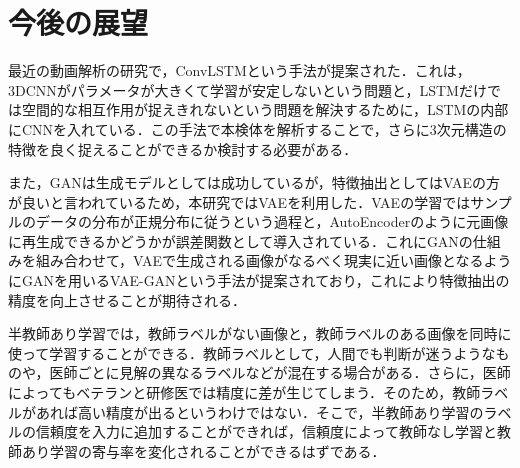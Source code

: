 \section{今後の展望}
最近の動画解析の研究で，ConvLSTMという手法が提案された\cite{要出典}．これは，3DCNNがパラメータが大きくて学習が安定しないという問題と，LSTMだけでは空間的な相互作用が捉えきれないという問題を解決するために，LSTMの内部にCNNを入れている．この手法で本検体を解析することで，さらに3次元構造の特徴を良く捉えることができるか検討する必要がある．

また，GANは生成モデルとしては成功しているが，特徴抽出としてはVAEの方が良いと言われているため，本研究ではVAEを利用した．VAEの学習ではサンプルのデータの分布が正規分布に従うという過程と，AutoEncoderのように元画像に再生成できるかどうかが誤差関数として導入されている．これにGANの仕組みを組み合わせて，VAEで生成される画像がなるべく現実に近い画像となるようにGANを用いるVAE-GANという手法が提案されており，これにより特徴抽出の精度を向上させることが期待される\cite{要出典}．

半教師あり学習では，教師ラベルがない画像と，教師ラベルのある画像を同時に使って学習することができる．教師ラベルとして，人間でも判断が迷うようなものや，医師ごとに見解の異なるラベルなどが混在する場合がある．さらに，医師によってもベテランと研修医では精度に差が生じてしまう．そのため，教師ラベルがあれば高い精度が出るというわけではない．そこで，半教師あり学習のラベルの信頼度を入力に追加することができれば，信頼度によって教師なし学習と教師あり学習の寄与率を変化されることができるはずである．